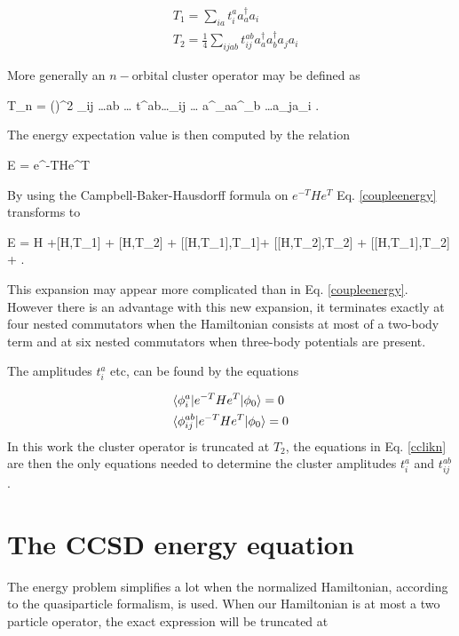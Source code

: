 \begin{align}
& T_1 = \sum_{ia} t^a_ia^\dagger_a a_i \\
& T_2 = \frac{1}{4} \sum_{ijab} t^{ab}_{ij} a^\dagger_aa^\dagger_ba_ja_i 
\end{align}

More generally an $n-$orbital cluster operator may be defined as %

\be
T_n = \left(\right)^2 \sum_{ij \dots ab \dots} t^{ab\dots}_{ij 
\dots} a^\dagger_aa^\dagger_b \dots a_ja_i 
\ee.

The energy expectation value is then computed by the relation 

\be
E = e^{-T}He^T  
\label{coupleenergy}
\ee

By using the Campbell-Baker-Hausdorff formula on $e^{-T}He^T$ Eq. \eqref{coupleenergy} transforms to

\be
E =  H +[H,T_1] + [H,T_2] + [[H,T_1],T_1]+ [[H,T_2],T_2] + [[H,T_1],T_2] + \cdots {}.
\ee 

This expansion may appear more complicated than in Eq. \eqref{coupleenergy}. 
However there is an advantage with this new expansion, it terminates exactly
at four nested commutators when the Hamiltonian consists at most of a 
two-body term and at six nested commutators when three-body potentials are
present. 

The amplitudes $t_i^a$ etc, can be found by the equations

\begin{equation}
\begin{split}
& \bra{\phi^a_i}e^{-T}He^T\ket{\phi_0}=0\\
& \bra{\phi^{ab}_{ij}}e^{-T}He^T\ket{\phi_0}=0
\end{split}
\label{cclikn}
\end{equation}
In this work the cluster operator is truncated at $T_2$, the equations in Eq. 
\eqref{cclikn} are then the 
only equations needed to determine the cluster amplitudes $t^a_i$ and $t^{ab}_{ij}$.\\

\section{The CCSD energy equation}

The energy problem simplifies a lot when the normalized Hamiltonian, according to the quasiparticle formalism, is used. When our Hamiltonian is at most
a two particle operator, the exact expression will be truncated at

